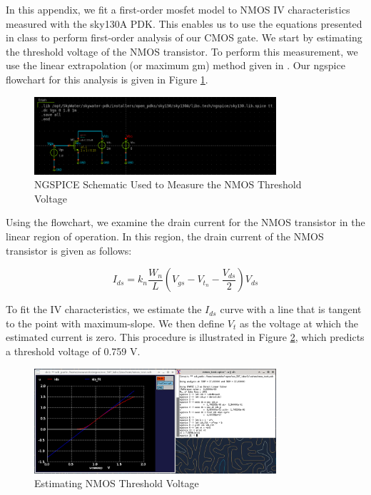\documentclass{article}
\begin{document}
	In this appendix, we fit a first-order mosfet model to NMOS IV characteristics measured with the sky130A PDK. This enables us to use the equations presented in class to perform first-order analysis of our CMOS gate. We start by estimating the threshold voltage of the NMOS transistor. To perform this measurement, we use the linear extrapolation (or maximum gm) method given in \cite{cmos_vlsi_design}. Our ngspice flowchart for this analysis is given in Figure \ref{fig::nmos_vt_meas_schem}.
	
	\begin{figure}[H]
		\centerline{\includegraphics[width=0.8\textwidth]{nmos_vt_meas_schem.png}}
		\caption{NGSPICE Schematic Used to Measure the NMOS Threshold Voltage}
		\label{fig::nmos_vt_meas_schem}
	\end{figure}
	
	\noindent Using the flowchart, we examine the drain current for the NMOS transistor in the linear region of operation. In this region, the drain current of the NMOS transistor is given as follows:
	
	\begin{equation}
		I_{ds} = k_n\frac{W_n}{L}\left(V_{gs} - V_{t_n} - \frac{V_{ds}}{2}\right)V_{ds}
	\end{equation}
	
	\noindent To fit the IV characteristics, we estimate the $I_{ds}$ curve with a line that is tangent to the point with maximum-slope. We then define $V_t$ as the voltage at which the estimated current is zero. This procedure is illustrated in Figure \ref{fig::nmos_vt_meas}, which predicts a threshold voltage of 0.759 V.
	
	\begin{figure}[H]
		\centerline{\includegraphics[width=0.8\textwidth]{nmos_vt_meas.png}}
		\caption{Estimating NMOS Threshold Voltage}
		\label{fig::nmos_vt_meas}
	\end{figure}
	
\end{document}

